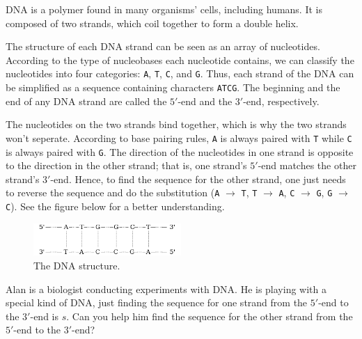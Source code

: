 DNA is a polymer found in many organisms' cells, including humans.
It is composed of two strands, which coil together to form a double helix.

The structure of each DNA strand can be seen as an array of nucleotides.
According to the type of nucleobases each nucleotide contains, we can classify the nucleotides into four categories: \texttt{A}, \texttt{T}, \texttt{C}, and \texttt{G}.
Thus, each strand of the DNA can be simplified as a sequence containing characters \texttt{ATCG}.
The beginning and the end of any DNA strand are called the $5'$-end and the $3'$-end, respectively.

The nucleotides on the two strands bind together, which is why the two strands won't seperate.
According to base pairing rules, \texttt{A} is always paired with \texttt{T} while \texttt{C} is always paired with \texttt{G}.
The direction of the nucleotides in one strand is opposite to the direction in the other strand;
that is, one strand's $5'$-end matches the other strand's $3'$-end.
Hence, to find the sequence for the other strand, one just needs to reverse the sequence and do the substitution
(\texttt{A} $\to$ \texttt{T}, \texttt{T} $\to$ \texttt{A}, \texttt{C} $\to$ \texttt{G}, \texttt{G} $\to$ \texttt{C}).
See the figure below for a better understanding.

\begin{figure}[h]
\center
\includegraphics[width=0.5\textwidth]{image/dna.png}
\caption{The DNA structure.}
\end{figure}
    

Alan is a biologist conducting experiments with DNA.
He is playing with a special kind of DNA, just finding the sequence for one strand from the $5'$-end to the $3'$-end is $s$.
Can you help him find the sequence for the other strand from the $5'$-end to the $3'$-end? 